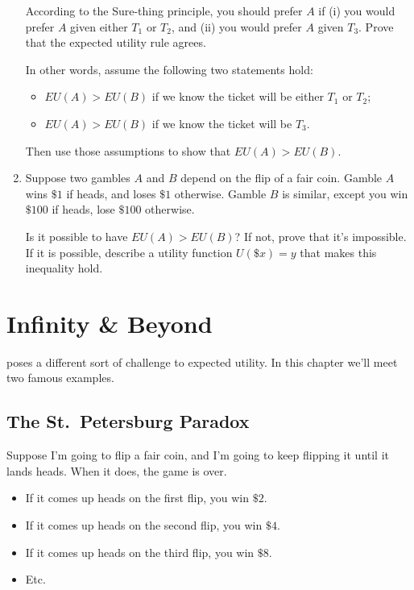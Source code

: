 \documentclass[justified]{tufte-book}
\providecommand{\tightlist}{%
  \setlength{\itemsep}{0pt}\setlength{\parskip}{0pt}}
\theoremstyle{definition}
\theoremstyle{definition}
\theoremstyle{definition}
\theoremstyle{definition}
\theoremstyle{remark}
\begin{document}
\begin{enumerate}
  According to the Sure-thing principle, you should prefer \(A\) if (i) you would prefer \(A\) given either \(T_1\) or \(T_2\), and (ii) you would prefer \(A\) given \(T_3\). Prove that the expected utility rule agrees.

  In other words, assume the following two statements hold:

  \begin{itemize}
  \tightlist
  \item
    \(EU(A) > EU(B)\) if we know the ticket will be either \(T_1\) or \(T_2\);
  \item
    \(EU(A) > EU(B)\) if we know the ticket will be \(T_3\).
  \end{itemize}

  Then use those assumptions to show that \(EU(A) > EU(B)\).
\item
  Suppose two gambles \(A\) and \(B\) depend on the flip of a fair coin. Gamble \(A\) wins \(\$1\) if heads, and loses \(\$1\) otherwise. Gamble \(B\) is similar, except you win \(\$100\) if heads, lose \(\$100\) otherwise.

  Is it possible to have \(EU(A) > EU(B)\)? If not, prove that it's impossible. If it is possible, describe a utility function \(U(\$x) = y\) that makes this inequality hold.
\end{enumerate}

\hypertarget{infinity-beyond}{%
\chapter{Infinity \& Beyond}\label{infinity-beyond}}

 poses a different sort of challenge to expected utility. In this chapter we'll meet two famous examples.

\hypertarget{the-st.-petersburg-paradox}{%
\section{The St.~Petersburg Paradox}\label{the-st.-petersburg-paradox}}

Suppose I'm going to flip a fair coin, and I'm going to keep flipping it until it lands heads. When it does, the game is over.

\begin{itemize}
\tightlist
\item
  If it comes up heads on the first flip, you win \(\$2\).
\item
  If it comes up heads on the second flip, you win \(\$4\).
\item
  If it comes up heads on the third flip, you win \(\$8\).
\item
  Etc.
\end{itemize}
\end{document}
